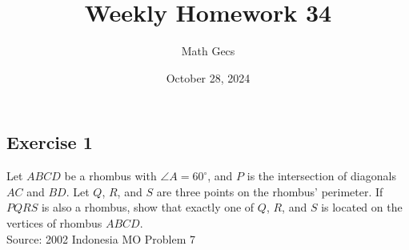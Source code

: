 \documentclass[12pt]{article}
\title{Weekly Homework 34}
\author{Math Gecs}
\date{October 28, 2024}
\begin{document}
\maketitle

\subsection*{Exercise 1}
Let $ABCD$ be a rhombus with $\angle A = 60^\circ$, and $P$ is the intersection of diagonals $AC$ and $BD$. Let $Q$, $R$, and $S$ are three points on the rhombus' perimeter. If $PQRS$ is also a rhombus, show that exactly one of $Q$, $R$, and $S$ is located on the vertices of rhombus $ABCD$.\\

Source: 2002 Indonesia MO Problem 7\\
\end{document}
